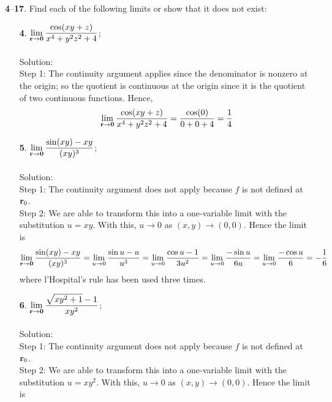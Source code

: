 \documentclass[12pt]{amsbook}
\begin{document}
\noindent
{\small {\bf 4}--{\bf 17}}. Find each of the following limits or show that it does not exist:
\begin{enumerate}
\item[{\small\bf 4}.] $\! \begin{aligned}[t]
\lim_{{\bf r} \rightarrow {\bf 0}}\frac{\cos(xy+z)}{x^4+y^2z^2+4} \end{aligned}$;
\\
\\
{\sc Solution}:
\\
{\sf Step 1}: The continuity argument applies since the denominator is nonzero at the origin; so the quotient is continuous at the origin since it is the quotient of two continuous functions. Hence,
$$\lim_{{\bf r} \rightarrow {\bf 0}}\frac{\cos(xy+z)}{x^4+y^2z^2+4} = \frac{\cos(0)}{0+0+4}=\frac{1}{4}$$
\item[{\small\bf 5}.] $\! \begin{aligned}[t]
\lim_{{\bf r} \rightarrow {\bf 0}}\frac{\sin(xy)-xy}{(xy)^3} \end{aligned}$;
\\
\\
{\sc Solution}:
\\
{\sf Step 1}: The continuity argument does not apply because $f$ is not defined at ${\bf r}_0$.
\\
{\sf Step 2}: We are able to transform this into a one-variable limit with the substitution $u=xy$. With this, $u\rightarrow 0$ as $(x,y)\rightarrow (0,0)$. Hence the limit is
$$\lim_{{\bf r} \rightarrow {\bf 0}}\frac{\sin(xy)-xy}{(xy)^3}=\lim_{u \rightarrow 0}\frac{\sin u-u}{u^3}=\lim_{u \rightarrow 0}\frac{\cos u-1}{3u^2}=\lim_{u \rightarrow 0}\frac{-\sin u}{6u}=\lim_{u \rightarrow 0}\frac{-\cos u}{6}=-\frac{1}{6}$$
where l'Hospital's rule has been used three times.
\\
\item[{\small\bf 6}.] $\! \begin{aligned}[t]
\lim_{{\bf r} \rightarrow {\bf 0}}\frac{\sqrt{xy^2+1}-1}{xy^2} \end{aligned}$;
\\
\\
{\sc Solution}:
\\
{\sf Step 1}: The continuity argument does not apply because $f$ is not defined at ${\bf r}_0$.
\\
{\sf Step 2}: We are able to transform this into a one-variable limit with the substitution $u=xy^2$. With this, $u\rightarrow 0$ as $(x,y)\rightarrow (0,0)$. Hence the limit is

\end{enumerate}
\end{document}
